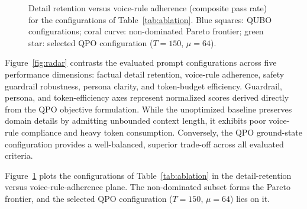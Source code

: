 \documentclass[review,12pt,times,authoryear]{elsarticle}
\theoremstyle{definition}
\begin{document}
\begin{figure}[t]
\centering
{}
\caption{Detail retention versus voice-rule adherence (composite pass rate) for the configurations of Table~\ref{tab:ablation}. Blue squares: QUBO configurations; coral curve: non-dominated Pareto frontier; green star: selected QPO configuration ($T=150$, $\mu=64$).}
\label{fig:pareto}
\end{figure}

Figure~\ref{fig:radar} contrasts the evaluated prompt configurations across five performance dimensions: factual detail retention, voice-rule adherence, safety guardrail robustness, persona clarity, and token-budget efficiency. Guardrail, persona, and token-efficiency axes represent normalized scores derived directly from the QPO objective formulation. While the unoptimized baseline preserves domain details by admitting unbounded context length, it exhibits poor voice-rule compliance and heavy token consumption. Conversely, the QPO ground-state configuration provides a well-balanced, superior trade-off across all evaluated criteria.

Figure~\ref{fig:pareto} plots the configurations of Table~\ref{tab:ablation} in the detail-retention versus voice-rule-adherence plane. The non-dominated subset forms the Pareto frontier, and the selected QPO configuration ($T=150$, $\mu=64$) lies on it.
\end{document}
